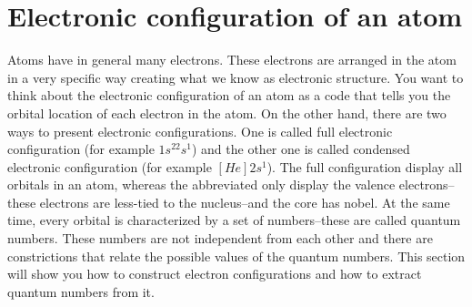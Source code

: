 \documentclass[main.tex]{subfiles}
\begin{document}
\section{Electronic configuration of an atom}
Atoms have in general many electrons. These electrons are arranged in the atom in a very specific way creating what we know as electronic structure. You want to think about the electronic configuration of an atom as a code that tells you the orbital location of each electron in the atom. On the other hand, there are two ways to present electronic configurations. One is called full electronic configuration (for example $1s^22s^1$) and the other one is called condensed electronic configuration (for example $[He]2s^1$). The full configuration display all orbitals in an atom, whereas the abbreviated only display the valence electrons--these electrons are less-tied to the nucleus--and the core has nobel. At the same time, every orbital is characterized by a set of numbers--these are called quantum numbers. These numbers are not independent from each other and there are constrictions that relate the possible values of the quantum numbers. This section will show you how to construct electron configurations and how to extract quantum numbers from it.
\sloppy
\end{document}
